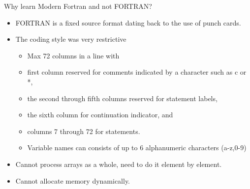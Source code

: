 \documentclass[c,mathserif,compress,xcolor=svgnames]{beamer}
\newenvironment{eblock}[0]
{
\begin{beamerboxesrounded}[upper=uppercol2,lower=lowercol2,shadow=true]}
{\end{beamerboxesrounded}}
\begin{document}
\begin{frame}{Why learn Modern Fortran and not FORTRAN?}
  \begin{itemize}
    \item FORTRAN is a fixed source format dating back to the use of punch cards.
    \item The coding style was very restrictive
    \begin{itemize}
      \item Max 72 columns in a line with
      \item first column reserved for comments indicated by a character such as c or *,
      \item the second through fifth columns reserved for statement labels,
      \item the sixth column for continuation indicator, and
      \item columns 7 through 72 for statements.
      \item Variable names can consists of up to 6 alphanumeric characters (a-z,0-9)
    \end{itemize}
    \item Cannot process arrays as a whole, need to do it element by element.
    \item Cannot allocate memory dynamically.
  \end{itemize}
\end{frame}

\begin{frame}[fragile]{FORTRAN 77 Example}
  \begin{eblock}{SAXPY Code}
    Fortran},basicstyle=\fontsize{6}{5}\selectfont\ttfamily]{./saxpy.f}
  \end{eblock}
\end{frame}
\end{document}

